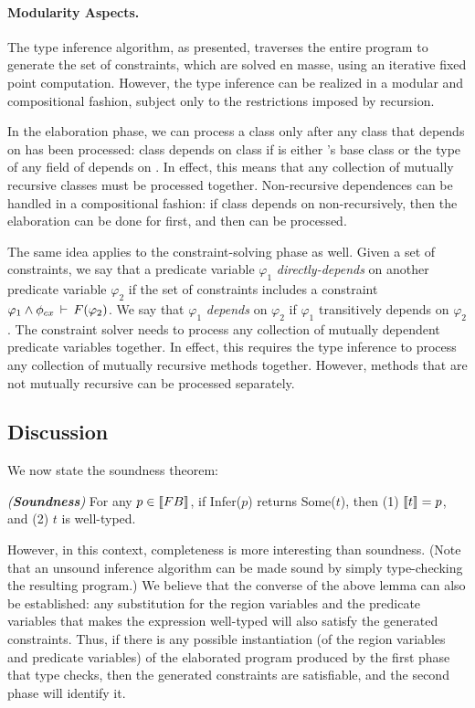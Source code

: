 \paragraph{Modularity Aspects.}
The type inference algorithm, as presented, traverses the entire program to
generate the set of constraints, which are solved en masse, using an iterative
fixed point computation. However, the type inference can be realized in a
modular and compositional fashion, subject only to the restrictions imposed
by recursion.

In the elaboration phase, we can process a class  only after any class
 that  depends on has been processed: class  depends on
class  if  is either 's base class or the type of any field
of  depends on . In effect, this means that any collection of
mutually recursive classes must be processed together. Non-recursive
dependences can be handled in a compositional fashion: if class 
depends on  non-recursively, then the elaboration can be done for
 first, and then  can be processed.

The same idea applies to the constraint-solving phase as well.
Given a set of constraints, we say that a predicate variable $\varphi_1$
\emph{directly-depends} on another predicate variable $\varphi_2$ if the set of
constraints includes a constraint $\varphi_1 \wedge \phi_{cx}\,\vdash\,F(\varphi_2)$.
We say that $\varphi_1$ \emph{depends} on $\varphi_2$ if $\varphi_1$ transitively
depends on $\varphi_2$.
The constraint solver needs to process any collection of mutually dependent
predicate variables together.
In effect, this requires the type inference to process any collection of
mutually recursive methods together.
However, methods that are not mutually recursive can be processed separately.

\subsection{Discussion}

We now state the soundness theorem:

\begin{theorem}
\emph{(\textbf{Soundness})}
For any $p \in \llbracket {\sc FB} \rrbracket$, if Infer($p$) returns Some($t$), then
(1) $\llbracket t \rrbracket = p$, and
(2) $t$ is well-typed.
\end{theorem}


However, in this context, completeness is more interesting than soundness.
(Note that an unsound inference algorithm can be made sound by simply type-checking
the resulting program.)
We believe that the converse of the above lemma can also be established:
any substitution for the region variables and the predicate variables that makes the
expression well-typed will also satisfy the generated constraints.
Thus, if there is any possible instantiation (of the region variables and predicate variables) of
the elaborated program produced by the first phase that type checks, then the generated
constraints are satisfiable, and the second phase will identify it.

